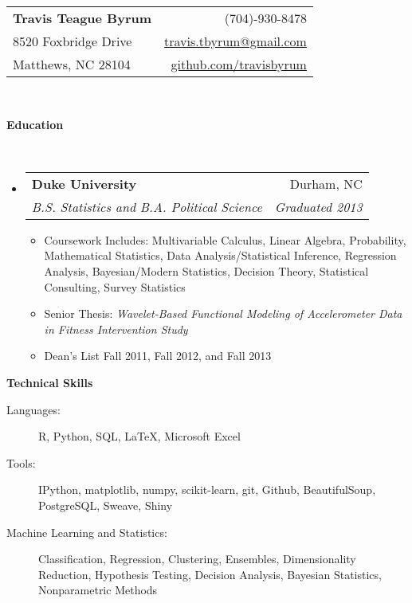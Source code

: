 \documentclass[letterpaper,11pt]{article}
\makeatletter
\newcommand{\resitem}[1]{\item #1 \vspace{-2pt}}
\newcommand{\resheading}[1]{{\large \colorbox{mygrey}{\begin{minipage}{\textwidth}{\textbf{#1 \vphantom{p\^{E}}}}\end{minipage}}}}
\newcommand{\ressubheading}[4]{
\begin{tabular*}{6.5in}{l@{\extracolsep{\fill}}r}
		\textbf{#1} & #2 \\
		\textit{#3} & \textit{#4} \\
\end{tabular*}\vspace{-6pt}}
\makeatother
\begin{document}
\newcommand{\mywebheader}{
\begin{tabular*}{7in}{l@{\extracolsep{\fill}}r}
	\textbf{\Large Travis Teague Byrum}  & (704)-930-8478\\
	8520 Foxbridge Drive & \href{mailto:travis.tbyrum@gmail.com}{travis.tbyrum@gmail.com} \\
	Matthews, NC 28104 & \href{https://github.com/travisbyrum}{github.com/travisbyrum}\\
\end{tabular*}
\\
\vspace{0.1in}}

\mywebheader

\resheading{Education}
\\
	\begin{itemize}
		\item[]
			\ressubheading{Duke University}{Durham, NC}{B.S. Statistics and B.A. Political Science}{Graduated 2013}
				{ \footnotesize
				\begin{itemize}
					\resitem{Coursework Includes: Multivariable Calculus, Linear Algebra, Probability, Mathematical Statistics, Data Analysis/Statistical Inference, Regression Analysis, Bayesian/Modern Statistics, Decision Theory, Statistical Consulting, Survey Statistics}
					\resitem{Senior Thesis: \textit{Wavelet-Based Functional Modeling of Accelerometer Data in Fitness Intervention Study}} 
					\resitem{Dean's List Fall 2011, Fall 2012, and Fall 2013} 
				\end{itemize}
				}
	\end{itemize} %


\resheading{Technical Skills}
	\begin{description}
		\item[Languages:] { \footnotesize R, Python, SQL, \LaTeX, Microsoft Excel
		}
		\item[Tools:] { \footnotesize IPython, matplotlib, numpy, scikit-learn, git, Github, BeautifulSoup, PostgreSQL, Sweave, Shiny
		}
		\item[Machine Learning and Statistics:] { \footnotesize Classification, Regression, Clustering, Ensembles, Dimensionality Reduction, Hypothesis Testing, Decision Analysis, Bayesian Statistics, Nonparametric Methods
		}
	\end{description} %
\end{document}
